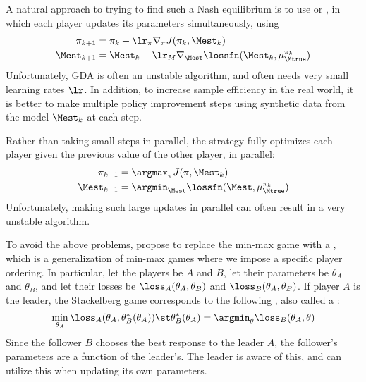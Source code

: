 A natural approach to trying to find such a Nash equilibrium
is to use  or ,
in which each player updates its parameters simultaneously,
using
\begin{align*}
  \pi_{k+1} &= \pi_k + \lr_{\pi} \nabla_{\pi} J(\pi_k, \Mest_k) \\
  \Mest_{k+1} &= \Mest_k
  -\lr_{M} \nabla_{\Mest} \lossfn(\Mest_k, \mu_{\Mtrue}^{\pi_k})
\end{align*}
Unfortunately, GDA is often an unstable algorithm,
and often needs very small learning rates $\lr$.
In addition, to increase sample efficiency in the real world,
it is better to make multiple policy improvement steps
using synthetic data from the model  $\Mest_k$ at each step.

Rather than taking small steps in parallel,
the  strategy fully optimizes
each player given the previous value of the other player,
in parallel:
\begin{align*}
  \pi_{k+1} &= \argmax_{\pi} J(\pi, \Mest_k) \\
  \Mest_{k+1} &= \argmin_{\Mest} \lossfn(\Mest, \mu_{\Mtrue}^{\pi_k})
\end{align*}
Unfortunately, making such large updates in parallel
can often result in a very unstable algorithm.

To avoid the above problems,
\citep{Rajeswaran2020}
propose to replace the min-max
game with a , which is a generalization
of min-max games where we impose a specific player ordering.
In particular, let the players be $A$ and $B$,
let their parameters be $\theta_A$ and $\theta_B$,
and let their losses be
$\loss_A(\theta_A,\theta_B)$
and
$\loss_B(\theta_A,\theta_B)$.
If player $A$ is the leader, the Stackelberg game corresponds
to the following ,
also called a :
\begin{align*}
  \min_{\theta_A} \loss_A(\theta_A, \theta^*_B(\theta_A))
  \st
  \theta^*_B(\theta_A)  = \argmin_{\theta} \loss_B(\theta_A, \theta)
\end{align*}
Since the follower $B$ chooses the best response
to the leader $A$, the follower's parameters are a function
of the leader's. The leader is aware of this, and can utilize
this when updating its own parameters.

